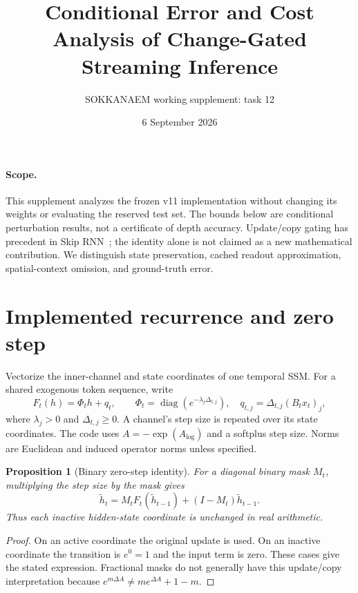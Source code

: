 \documentclass[11pt]{article}
\title{Conditional Error and Cost Analysis of Change-Gated Streaming Inference}
\author{SOKKANAEM working supplement: task 12}
\date{6 September 2026}
\newtheorem{proposition}{Proposition}
\begin{document}
\maketitle

\paragraph{Scope.}
This supplement analyzes the frozen v11 implementation without changing its
weights or evaluating the reserved test set. The bounds below are conditional
perturbation results, not a certificate of depth accuracy. Update/copy gating
has precedent in Skip RNN~\cite{campos2018}; the identity alone is not claimed
as a new mathematical contribution. We distinguish state preservation, cached
readout approximation, spatial-context omission, and ground-truth error.

\section{Implemented recurrence and zero step}
Vectorize the inner-channel and state coordinates of one temporal SSM.
For a shared exogenous token sequence, write
\begin{equation}\label{eq:recurrence}
 F_t(h)=\Phi_t h+q_t,\qquad
 \Phi_t=\operatorname{diag}(e^{-\lambda_j\Delta_{t,j}}),\quad
 q_{t,j}=\Delta_{t,j}(B_tx_t)_j,
\end{equation}
where $\lambda_j>0$ and $\Delta_{t,j}\ge0$. A channel's step size is repeated
over its state coordinates. The code uses $A=-\exp(A_{\log})$ and a softplus
step size. Norms are Euclidean and induced operator norms unless specified.

\begin{proposition}[Binary zero-step identity]\label{prop:identity}
For a diagonal binary mask $M_t$, multiplying the step size by the mask gives
\begin{equation}\label{eq:gate}
 \widetilde h_t=M_tF_t(\widetilde h_{t-1})+(I-M_t)\widetilde h_{t-1}.
\end{equation}
Thus each inactive hidden-state coordinate is unchanged in real arithmetic.
\end{proposition}
\begin{proof}
On an active coordinate the original update is used. On an inactive coordinate
the transition is $e^0=1$ and the input term is zero. These cases give the
stated expression. Fractional masks do not generally have this update/copy
interpretation because $e^{m\Delta A}\ne m e^{\Delta A}+1-m$.
\end{proof}
\end{document}
